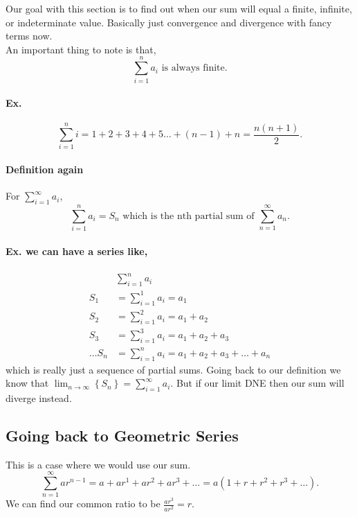 Our goal with this section is to find out when our sum will equal a finite, infinite, or indeterminate value. Basically just convergence and divergence with fancy terms now. \\

An important thing to note is that,
\[
\sum_{ i=1 } ^{ n } a_{ i } \text{ is always finite}
.\] 

\paragraph{Ex.}
\[
\sum_{ i=1 } ^{ n } i= 1+2+3+4+5\ldots + \left( n-1 \right) + n = \frac{ n\left( n+1 \right)  }{ 2 }
.\] 

\newpage
\paragraph{Definition again\\}
For $ \sum_{ i=1 } ^{ \infty } a_i $, 
\[
\sum_{ i=1 } ^{ n } a_i = S_n \text{ which is the nth partial sum of }\sum_{ n=1 } ^{ \infty } a_n
.\] 

\paragraph{Ex. we can have a series like,}
\begin{align*}
&\sum_{ i=1 } ^{ n } a_i \\
S_1 &= \sum_{ i=1 } ^{ 1 } a_i = a_1 \\
S_2 &= \sum_{ i=1 } ^{ 2 } a_i = a_1 + a_2 \\
S_3 &= \sum_{ i=1 } ^{ 3 } a_i = a_1 + a_2 + a_3 \\
\ldots
S_n &= \sum_{ i=1 } ^{ n } a_i = a_1 + a_2 + a_3 + \ldots + a_n
\end{align*}
which is really just a sequence of partial sums. Going back to our definition we know that $ \lim_{ n \to \infty} \left\{ S_n \right\} =\sum_{ i=1 } ^{ \infty } a_i $. But if our limit DNE then our sum will diverge instead. 

\subsection{Going back to Geometric Series}%
\label{sub:Going back to Geometric Series}

This is a case where we would use our sum.
\[
\sum_{ n=1 } ^{ \infty } ar^{ n-1 }=a + ar^{ 1 } + ar^{ 2 } + ar^{ 3 } + \ldots = a\left( 1+r+r^{ 2 }+r^{ 3 }+\ldots \right)
.\] 
We can find our common ratio to be $ \frac{ ar^3 }{ ar^2 }=r $.\\

